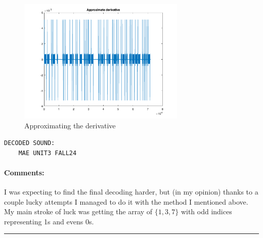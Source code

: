 \begin{figure}[H]
    \centering
    \includegraphics[width=8cm]{figures/ex3_diff.png}
    \caption{Approximating the derivative}
    \label{fig:figures/ex3_diff.png}
\end{figure}

\begin{verbatim}
DECODED SOUND:
    MAE UNIT3 FALL24
\end{verbatim}

\paragraph{Comments:}
I was expecting to find the final decoding harder, but (in my
opinion) thanks to a couple lucky attempts I managed to do it with
the method I mentioned above.
My main stroke of luck was getting the array of $\{1,3,7\}$ with odd
indices representing 1s and evens 0s.

\bigskip
\hrule

